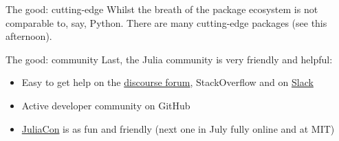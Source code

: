 \documentclass[compress,presentation,aspectratio=169]{beamer}
\begin{document}
\begin{frame}[label={sec:org2946c39}]{The good: cutting-edge}
  \footnotesize
Whilst the breath of the package ecosystem is not comparable to, say,
Python.  There are many \alert{cutting-edge} packages (see this afternoon).



\end{frame}

\begin{frame}[label={sec:orgebef73a}]{The good: community}
  \footnotesize
Last, the Julia community is very friendly and helpful:

\begin{itemize}
\item Easy to get help on the \href{https://discourse.julialang.org}{discourse forum}, StackOverflow and on \href{https://julialang.slack.com/}{Slack}
\item Active developer community on GitHub
\item \href{https://juliacon.org}{JuliaCon} is as fun and friendly (next one in July fully online and at MIT)
\end{itemize}

\end{frame}
\end{document}
